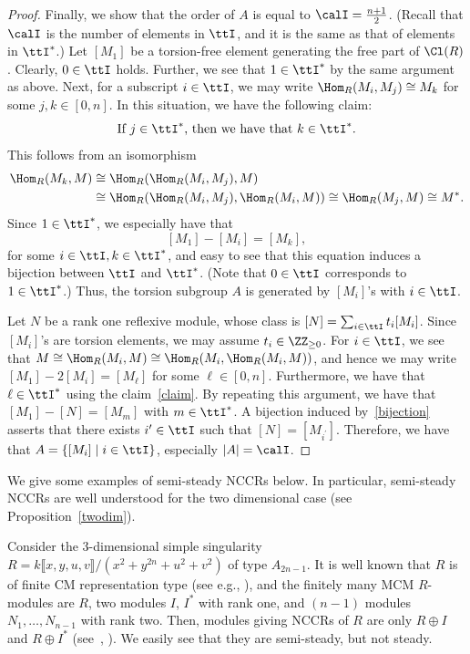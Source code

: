 \begin{proof}
Finally, we show that the order of $A$ is equal to $\calI=\frac{n+1}{2}$. (Recall that $\calI$ is the number of elements in $\ttI$, and it is the same as that of elements in $\ttI^*$.) Let $[M_1]$ be a torsion-free element generating the free part of $\Cl(R)$. Clearly, $0\in \ttI$ holds. Further, we see that $1\in\ttI^*$ by the same argument as above. Next, for a subscript $i\in\ttI$, we may write $\Hom_R(M_i,M_j)\cong M_k$ for some $j, k\in[0,n]$. In this situation, we have the following claim:
\begin{equation}\label{claim}
\text{If $j\in\ttI^*$, then we have that $k\in\ttI^*$}.
\end{equation}
This follows from an isomorphism
\begin{equation*}
\begin{split}
\Hom_R(M_k,M)&\cong\Hom_R(\Hom_R(M_i,M_j),M) \\
&\cong\Hom_R(\Hom_R(M_i,M_j),\Hom_R(M_i,M))\cong\Hom_R(M_j,M)\cong M^*.
\end{split}
\end{equation*}
Since $1\in\ttI^*$, we especially have that
\begin{equation}\label{bijection}
[M_1]-[M_i]=[M_k],
\end{equation}
for some $i\in\ttI, k\in\ttI^*$, and easy to see that this equation induces a bijection between $\ttI$ and $\ttI^*$. (Note that $0\in\ttI$ corresponds to $1\in\ttI^*$.) Thus, the torsion subgroup $A$ is generated by $[M_i]$'s with $i\in\ttI$.

Let $N$ be a rank one reflexive module, whose class is $[N]=\sum_{i\in\ttI}t_i[M_i]$. Since $[M_i]$'s are torsion elements, we may assume $t_i\in\ZZ_{\ge0}$. For $i\in\ttI$, we see that $M\cong\Hom_R(M_i,M)\cong\Hom_R(M_i,\Hom_R(M_i,M))$, and hence we may write $[M_1]-2[M_i]=[M_\ell]$ for some $\ell\in[0,n]$. Furthermore, we have that $\ell\in\ttI^*$ using the claim~\eqref{claim}. By repeating this argument, we have that $[M_1]-[N]=[M_m]$ with $m\in\ttI^*$. A bijection induced by~\eqref{bijection} asserts that there exists $i^\prime\in\ttI$ such that $[N]=[M_{i^\prime}]$. Therefore, we have that $A=\{[M_i] \mid i\in\ttI \}$, especially $|A|=\calI$.
\end{proof}

We give some examples of semi-steady NCCRs below. In particular, semi-steady NCCRs are well understood for the two dimensional case (see Proposition~\ref{twodim}).

\begin{exem}\label{ex_Ansing}
Consider the $3$-dimensional simple singularity $R=k\llbracket x,y,u,v\rrbracket /(x^2+y^{2n}+u^2+v^2)$ of type $A_{2n-1}$. It is well known that $R$ is of finite CM representation type (see e.g., \cite[Chapter~12]{Yos}), and the finitely many MCM $R$-modules are $R$, two modules $I$, $I^*$ with rank one, and $(n-1)$ modules $N_1,\dots,N_{n-1}$ with rank two. Then, modules giving NCCRs of $R$ are only $R\oplus I$ and $R\oplus I^*$ (see~\cite[Proposition~2.4]{BIKR}, \cite[Example~3.6]{Dao}). We easily see that they are semi-steady, but not steady.
\end{exem}


